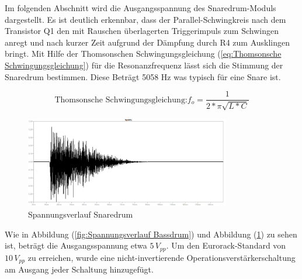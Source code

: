 Im folgenden Abschnitt wird die Ausgangsspannung des Snaredrum-Moduls dargestellt. Es ist deutlich erkennbar, dass der Parallel-Schwingkreis nach dem Transistor Q1 den mit Rauschen überlagerten Triggerimpuls zum Schwingen anregt und nach kurzer Zeit aufgrund der Dämpfung durch R4 zum Ausklingen bringt. Mit Hilfe der Thomsonschen Schwingungsgleichung (\ref{eq:Thomsonsche Schwingungsgleichung}) für die Resonanzfrequenz lässt sich die Stimmung der Snaredrum bestimmen. Diese Beträgt 5058 Hz was typisch für eine Snare ist.

\begin{equation}
   \text{Thomsonsche Schwingungsgleichung:} f_o=\frac{1}{2*\pi\sqrt{L*C}}
    \label{eq:Thomsonsche Schwingungsgleichung}
\end{equation}


\begin{figure}[H]
    \centering
    \includegraphics[width=0.8\textwidth]{Images/SD_N_Spice.png}
    \caption[Spannungsverlauf Snaredrum]{Spannungsverlauf Snaredrum}
    \label{fig:Spannungsverlauf Snaredrum}
\end{figure}


Wie in Abbildung (\ref{fig:Spannungsverlauf Bassdrum}) und Abbildung (\ref{fig:Spannungsverlauf Snaredrum}) zu sehen ist, beträgt die Ausgangsspannung etwa $5\,\unit{V_{pp}}$. Um den Eurorack-Standard von $10\,\unit{V_{pp}}$ zu erreichen, wurde eine nicht-invertierende Operationsverstärkerschaltung am Ausgang jeder Schaltung hinzugefügt.